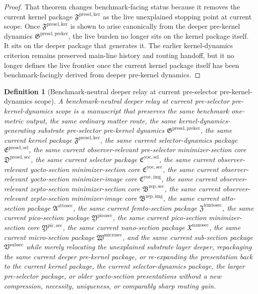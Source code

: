 \documentclass[11pt]{article}
\newcommand{\PreKernelPackage}{\mathfrak G^{\mathrm{presel,preker}}}
\newcommand{\KernelPackage}{\mathfrak F^{\mathrm{presel,ker}}}
\newcommand{\PreSectionSelectorPackage}{\mathfrak E^{\mathrm{presel,sel}}}
\newcommand{\PreSelectorMinSectionCore}{\mathfrak D^{\mathrm{presel,sec}}}
\newcommand{\YoctoSelectorPackage}{\mathfrak C^{\mathrm{yoc,sel}}}
\newcommand{\YoctoImageCore}{\mathfrak C^{\mathrm{yoc,img}}}
\newcommand{\YoctoMinSectionCore}{\mathfrak C^{\mathrm{yoc,sec}}}
\newcommand{\ZeptoImageCore}{\mathfrak B^{\mathrm{zep,img}}}
\newcommand{\ZeptoMinSectionCore}{\mathfrak B^{\mathrm{zep,sec}}}
\newcommand{\AttoSectionPackage}{\mathfrak A^{\mathrm{attosec}}}
\newcommand{\FemtoSectionPackage}{\mathfrak Z^{\mathrm{femtosec}}}
\newcommand{\PicoSectionPackage}{\mathfrak Y^{\mathrm{picosec}}}
\newcommand{\PicoMinSectionCore}{\mathfrak Y^{\mathrm{pic,sec}}}
\newcommand{\NanoSectionPackage}{\mathfrak X^{\mathrm{nanosec}}}
\newcommand{\MicroSectionPackage}{\mathfrak W^{\mathrm{microsec}}}
\newcommand{\SubSectionPackage}{\mathfrak V^{\mathrm{subsec}}}
\newtheorem{definition}{Definition}
\begin{document}
\begin{proof}
That theorem changes benchmark-facing status because it removes the current kernel package \(\KernelPackage\) as the live unexplained stopping point at current scope. Once \(\KernelPackage\) is shown to arise canonically from the deeper pre-kernel dynamics \(\PreKernelPackage\), the live burden no longer sits on the kernel package itself. It sits on the deeper package that generates it. The earlier kernel-dynamics criterion remains preserved main-line history and routing handoff, but it no longer defines the live frontier once the current kernel package itself has been benchmark-facingly derived from deeper pre-kernel dynamics.
\end{proof}

\begin{definition}[Benchmark-neutral deeper relay at current pre-selector pre-kernel-dynamics scope]
A \emph{benchmark-neutral deeper relay at current pre-selector pre-kernel-dynamics scope} is a manuscript that preserves the same benchmark one-metric output, the same ordinary matter route, the same kernel-dynamics-generating substrate pre-selector pre-kernel dynamics \(\PreKernelPackage\), the same current kernel package \(\KernelPackage\), the same current selector-dynamics package \(\PreSectionSelectorPackage\), the same current observer-relevant pre-selector minimizer-section core \(\PreSelectorMinSectionCore\), the same current selector package \(\YoctoSelectorPackage\), the same current observer-relevant yocto-section minimizer-section core \(\YoctoMinSectionCore\), the same current observer-relevant yocto-section minimizer-image core \(\YoctoImageCore\), the same current observer-relevant zepto-section minimizer-section core \(\ZeptoMinSectionCore\), the same current observer-relevant zepto-section minimizer-image core \(\ZeptoImageCore\), the same current atto-section package \(\AttoSectionPackage\), the same current femto-section package \(\FemtoSectionPackage\), the same current pico-section package \(\PicoSectionPackage\), the same current pico-section minimizer-section core \(\PicoMinSectionCore\), the same current nano-section package \(\NanoSectionPackage\), the same current micro-section package \(\MicroSectionPackage\), and the same current sub-section package \(\SubSectionPackage\) while merely relocating the unexplained substrate layer deeper, repackaging the same current deeper pre-kernel package, or re-expanding the presentation back to the current kernel package, the current selector-dynamics package, the larger pre-selector package, or older yocto-section presentations without a new compression, necessity, uniqueness, or comparably sharp routing gain.
\end{definition}
\end{document}
